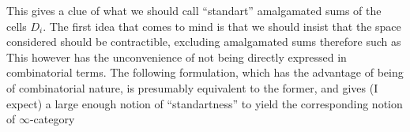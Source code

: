 This gives a clue of what we should call ``standart'' amalgamated sums of the cells $D_i$. The first idea that comes to mind is that we should insist that the space considered should be contractible, excluding amalgamated sums therefore such as
This  however has the unconvenience of not being directly expressed in combinatorial terms. The following formulation, which has the advantage of being of combinatorial nature, is presumably equivalent to the former, and gives  (I expect)  a large enough notion of ``standartness'' to yield  the corresponding notion of $\infty$-category  
